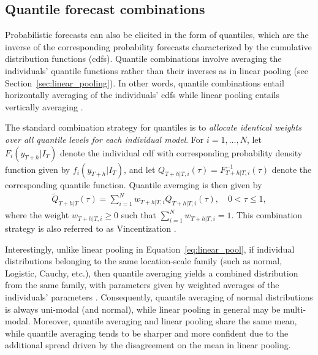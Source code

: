 \documentclass[a4paper,11pt]{article}
\begin{document}
\subsection{Quantile forecast combinations}
\label{sec:quantile_comb}

Probabilistic forecasts can also be elicited in the form of quantiles, which are the inverse of the corresponding probability forecasts characterized by the cumulative distribution functions (cdfs). Quantile combinations involve averaging the individuals' quantile functions rather than their inverses as in linear pooling (see Section~\ref{sec:linear_pooling}). In other words, quantile combinations entail horizontally averaging of the individuals' cdfs while linear pooling entails vertically averaging \citep{Lichtendahl2013-rt}.

The standard combination strategy for quantiles is to \textit{allocate identical weights over all quantile levels for each individual model}. For $i=1,\dots,N$, let $F_{i}(y_{T+h}|I_{T})$ denote the individual cdf with corresponding probability density function given by $f_{i}(y_{T+h}|I_{T})$, and let $Q_{T+h|T,i}(\tau) = F_{T+h|T,i}^{-1}(\tau)$ denote the corresponding quantile function. Quantile averaging is then given by
\begin{align}
  \label{eq:quantile_avg}
  \tilde{Q}_{T+h|T}(\tau) = \sum_{i=1}^{N} w_{T+h|T,i} Q_{T+h|T,i}(\tau), \quad 0 < \tau \leq 1,
\end{align}
where the weight $w_{T+h|T,i}\ge0$ such that $\sum_{i=1}^{N}w_{T+h|T,i}=1$. This combination strategy is also referred to as Vincentization \citep{vincent1912-fu}.

Interestingly, unlike linear pooling in Equation~\eqref{eq:linear_pool}, if individual distributions belonging to the same location-scale family (such as normal, Logistic, Cauchy, etc.), then quantile averaging yields a combined distribution from the same family, with parameters given by weighted averages of the individuals' parameters \citep{Ratcliff1979-cb,Thomas1980-lp}. Consequently, quantile averaging of normal distributions is always uni-modal (and normal), while linear pooling in general may be multi-modal. Moreover, quantile averaging and linear pooling share the same mean, while quantile averaging tends to be sharper and more confident due to the additional spread driven by the disagreement on the mean in linear pooling.
\end{document}

